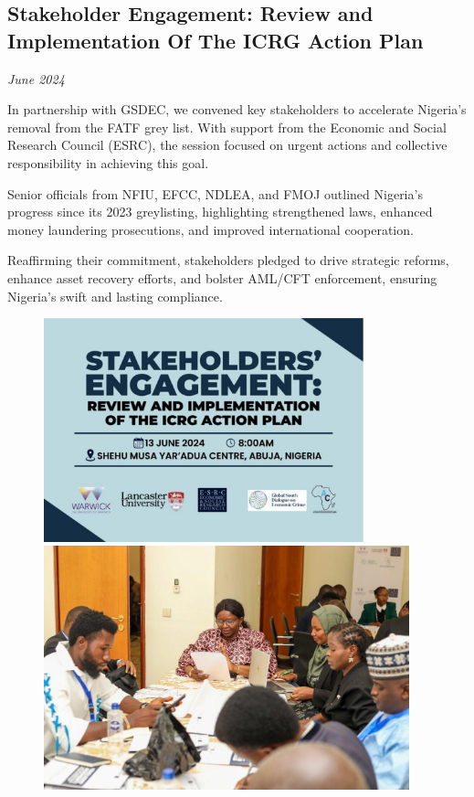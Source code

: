 \documentclass[
  letterpaper,
  DIV=11,
  numbers=noendperiod]{scrreprt}
\begin{document}
\subsection{Stakeholder Engagement: Review and Implementation Of The
ICRG Action
Plan}\label{stakeholder-engagement-review-and-implementation-of-the-icrg-action-plan}

\emph{June 2024}

In partnership with GSDEC, we convened key stakeholders to accelerate
Nigeria's removal from the FATF grey list. With support from the
Economic and Social Research Council (ESRC), the session focused on
urgent actions and collective responsibility in achieving this goal.

Senior officials from NFIU, EFCC, NDLEA, and FMOJ outlined Nigeria's
progress since its 2023 greylisting, highlighting strengthened laws,
enhanced money laundering prosecutions, and improved international
cooperation.

Reaffirming their commitment, stakeholders pledged to drive strategic
reforms, enhance asset recovery efforts, and bolster AML/CFT
enforcement, ensuring Nigeria's swift and lasting compliance.

\begin{figure}

\begin{minipage}{0.47\linewidth}
\includegraphics[width=3.64583in,height=\textheight,keepaspectratio]{images/strengthen/06_0_stake.jpg}\end{minipage}%
%
\begin{minipage}{0.53\linewidth}
\includegraphics[width=4.16667in,height=\textheight,keepaspectratio]{images/strengthen/06_1_stake.jpg}\end{minipage}%

\end{figure}%
\end{document}
